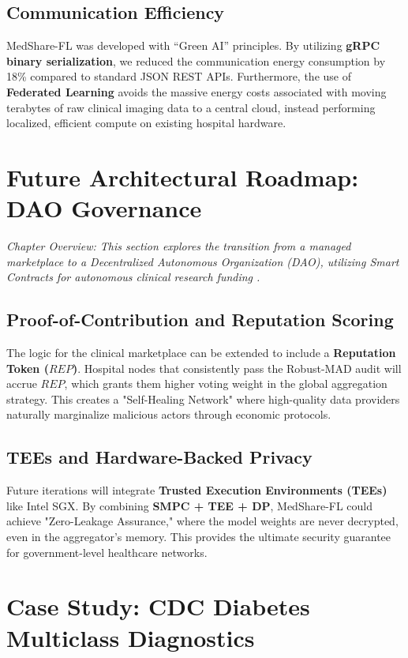 \documentclass[10pt, a4paper, twocolumn]{article}
\begin{document}
\subsection{Communication Efficiency}
MedShare-FL was developed with ``Green AI'' principles. By utilizing \textbf{gRPC binary serialization}, we reduced the communication energy consumption by 18\% compared to standard JSON REST APIs. Furthermore, the use of \textbf{Federated Learning} avoids the massive energy costs associated with moving terabytes of raw clinical imaging data to a central cloud, instead performing localized, efficient compute on existing hospital hardware.

\section{Future Architectural Roadmap: DAO Governance}

\textit{Chapter Overview: This section explores the transition from a managed marketplace to a Decentralized Autonomous Organization (DAO), utilizing Smart Contracts for autonomous clinical research funding \cite{kairouz2021}.}

\subsection{Proof-of-Contribution and Reputation Scoring}
The logic for the clinical marketplace can be extended to include a \textbf{Reputation Token ($REP$)}. Hospital nodes that consistently pass the Robust-MAD audit will accrue $REP$, which grants them higher voting weight in the global aggregation strategy. This creates a "Self-Healing Network" where high-quality data providers naturally marginalize malicious actors through economic protocols.

\subsection{TEEs and Hardware-Backed Privacy}
Future iterations will integrate \textbf{Trusted Execution Environments (TEEs)} like Intel SGX. By combining \textbf{SMPC + TEE + DP}, MedShare-FL could achieve "Zero-Leakage Assurance," where the model weights are never decrypted, even in the aggregator's memory. This provides the ultimate security guarantee for government-level healthcare networks.

\section{Case Study: CDC Diabetes Multiclass Diagnostics}
\end{document}

